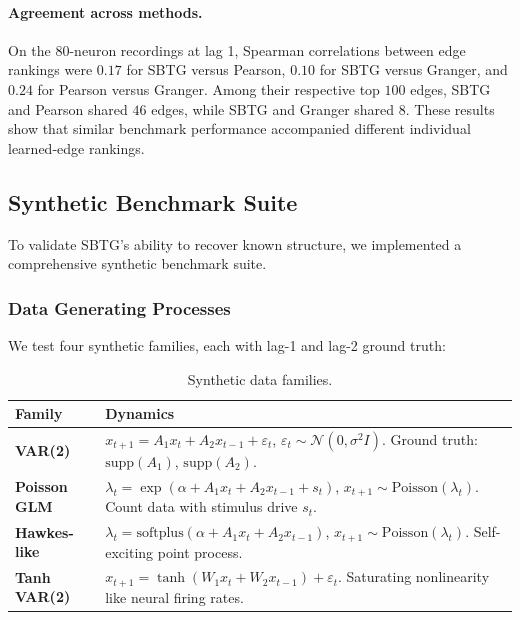 \documentclass{article}
\theoremstyle{plain}
\theoremstyle{definition}
\theoremstyle{remark}
\newcommand{\1}{\mathbf{1}}
\newcommand{\supp}{\mathrm{supp}}
\begin{document}
\paragraph{Agreement across methods.}
On the 80-neuron recordings at lag 1, Spearman correlations between edge rankings were $0.17$ for SBTG versus Pearson, $0.10$ for SBTG versus Granger, and $0.24$ for Pearson versus Granger. Among their respective top $100$ edges, SBTG and Pearson shared $46$ edges, while SBTG and Granger shared $8$. These results show that similar benchmark performance accompanied different individual learned-edge rankings.

\subsection{Synthetic Benchmark Suite}
\label{app:synthetic}

To validate SBTG's ability to recover known structure, we implemented a comprehensive synthetic benchmark suite.

\subsubsection{Data Generating Processes}

We test four synthetic families, each with lag-1 and lag-2 ground truth:

\begin{table}[h!]
\centering
\caption{Synthetic data families.}
\label{tab:synthetic_families}
\begin{small}
\begin{tabular}{@{}l p{}@{}}
\toprule
\textbf{Family} & \textbf{Dynamics} \\
\midrule
\textbf{VAR(2)} & $x_{t+1} = A_1 x_t + A_2 x_{t-1} + \varepsilon_t$, $\varepsilon_t \sim \mathcal{N}(0, \sigma^2 I)$. Ground truth: $\supp(A_1)$, $\supp(A_2)$. \\
\midrule
\textbf{Poisson GLM} & $\lambda_t = \exp(\alpha + A_1 x_t + A_2 x_{t-1} + s_t)$, $x_{t+1} \sim \mathrm{Poisson}(\lambda_t)$. Count data with stimulus drive $s_t$. \\
\midrule
\textbf{Hawkes-like} & $\lambda_t = \mathrm{softplus}(\alpha + A_1 x_t + A_2 x_{t-1})$, $x_{t+1} \sim \mathrm{Poisson}(\lambda_t)$. Self-exciting point process. \\
\midrule
\textbf{Tanh VAR(2)} & $x_{t+1} = \tanh(W_1 x_t + W_2 x_{t-1}) + \varepsilon_t$. Saturating nonlinearity like neural firing rates. \\
\bottomrule
\end{tabular}
\end{small}
\end{table}
\end{document}
